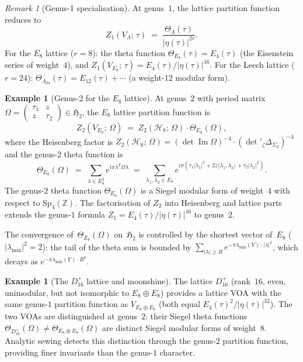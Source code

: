 \documentclass[11pt,reqno]{amsart}
\theoremstyle{definition}
\newtheorem{example}[theorem]{Example}
\theoremstyle{remark}
\newtheorem{remark}[theorem]{Remark}
\newcommand{\cH}{\mathcal{H}}
\newcommand{\bZ}{\mathbb{Z}}
\newcommand{\fH}{\mathfrak{H}}
\numberwithin{equation}{section}
\begin{document}
\begin{remark}[Genus-1 specialisation]
\label{rem:lattice-genus-1}
At genus~$1$, the lattice partition function reduces to
\[
Z_1(V_\Lambda;\,\tau)
\;=\;
\frac{\Theta_\Lambda(\tau)}{|\eta(\tau)|^{2r}}.
\]
For the $E_8$ lattice ($r = 8$): the theta function
$\Theta_{E_8}(\tau) = E_4(\tau)$ (the Eisenstein series of
weight~$4$), and
$Z_1(V_{E_8};\,\tau)
= E_4(\tau)/|\eta(\tau)|^{16}$.
For the Leech lattice ($r = 24$):
$\Theta_{\Lambda_{24}}(\tau) = E_{12}(\tau) + \cdots$
(a weight-$12$ modular form).
\end{remark}

\begin{example}[Genus-2 for the $E_8$ lattice]
\label{ex:e8-genus2}
At genus~$2$ with period matrix
$\Omega = \begin{pmatrix}\tau_1 & z \\ z & \tau_2
\end{pmatrix} \in \fH_2$, the $E_8$ lattice partition function
is
\[
Z_2(V_{E_8};\,\Omega)
\;=\;
Z_2(\cH_8;\,\Omega) \cdot \Theta_{E_8}(\Omega),
\]
where the Heisenberg factor is
$Z_2(\cH_8;\,\Omega) = (\det\operatorname{Im}\Omega)^{-4}
\cdot (\det{}'_\zeta\Delta_{\Sigma_2})^{-4}$
and the genus-$2$ theta function is
\[
\Theta_{E_8}(\Omega)
\;=\;
\sum_{\lambda \in E_8^2}
e^{i\pi\lambda^T\Omega\lambda}
\;=\;
\sum_{\lambda_1,\lambda_2 \in E_8}
e^{i\pi(\tau_1|\lambda_1|^2 + 2z\langle\lambda_1,
\lambda_2\rangle + \tau_2|\lambda_2|^2)}.
\]
The genus-$2$ theta function
$\Theta_{E_8}(\Omega)$ is a Siegel modular form of weight~$4$
with respect to $\mathrm{Sp}_4(\bZ)$.  The factorisation of
$Z_2$ into Heisenberg and lattice parts extends the genus-$1$
formula $Z_1 = E_4(\tau)/|\eta(\tau)|^{16}$ to genus~$2$.

The convergence of~$\Theta_{E_8}(\Omega)$ on~$\fH_2$ is
controlled by the shortest vector of~$E_8$
($|\lambda_{\min}|^2 = 2$): the tail of the theta sum is
bounded by
$\sum_{|\lambda| \geq R}
e^{-\pi\lambda_{\min}(Y)\cdot|\lambda|^2}$,
which decays as $e^{-\pi\lambda_{\min}(Y)\cdot R^2}$.
\end{example}

\begin{example}[The $D_{16}^+$ lattice and moonshine]
\label{ex:d16plus}
The lattice $D_{16}^+$ (rank~$16$, even, unimodular, but not
isomorphic to $E_8 \oplus E_8$) provides a lattice VOA with
the same genus-$1$ partition function as
$V_{E_8 \oplus E_8}$ (both equal
$E_4(\tau)^2/|\eta(\tau)|^{32}$).  The two VOAs are
distinguished at genus~$2$: their Siegel theta functions
$\Theta_{D_{16}^+}(\Omega) \neq
\Theta_{E_8 \oplus E_8}(\Omega)$ are distinct Siegel modular
forms of weight~$8$.  Analytic sewing detects
this distinction through the genus-$2$ partition function,
providing finer invariants than the genus-$1$ character.
\end{example}
\end{document}

